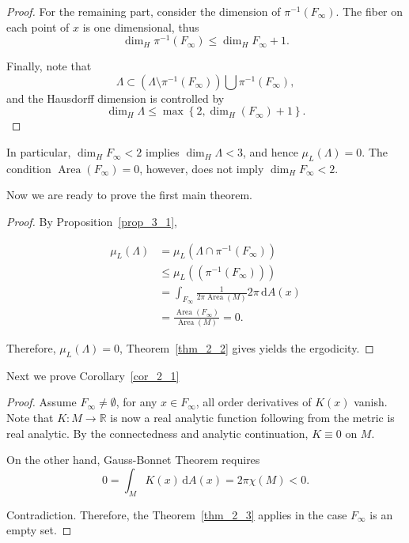 \documentclass[reqno,11pt]{article}
\theoremstyle{definition}
\theoremstyle{remark}
\numberwithin{equation}{section}
\DeclareMathOperator{\area}{Area}
\begin{document}
\begin{proof}
	For the remaining part, consider the dimension of $\pi^{-1}(F_{\infty})$. The fiber on each point of $x$ is one dimensional, thus
	\begin{displaymath}
		\dim_{H}\pi^{-1}(F_{\infty})\le \dim_{H}F_{\infty}+1.
	\end{displaymath}

	Finally, note that
	\begin{displaymath}
		\Lambda\subset \left(\Lambda\setminus\pi^{-1}(F_{\infty})\right)\bigcup \pi^{-1}(F_{\infty}),
	\end{displaymath}
	and the Hausdorff dimension is controlled by
	\begin{displaymath}
		\dim_{H}\Lambda\leq\max\left\{2,\dim_{H}(F_{\infty})+1\right\}.
	\end{displaymath}
\end{proof}

In particular, $\dim_{H}F_{\infty}<2$ implies $\dim_{H}\Lambda<3$, and hence $\mu_L(\Lambda)=0$. The condition $\area(F_\infty)=0$, however, does not imply $\dim_{H}F_{\infty}<2$.

Now we are ready to prove the first main theorem.

\surface*

\begin{proof}
	By Proposition~\ref{prop_3_1},

	\begin{displaymath}
		\begin{aligned}
			\mu_L(\Lambda) & =\mu_L(\Lambda\cap\pi^{-1}(F_\infty))                            \\
			               & \le \mu_L((\pi^{-1}(F_{\infty})))                                \\
			               & =\int_{F_{\infty}} \frac{1}{2\pi \area(M)} 2\pi \,\mathrm{d}A(x) \\
			               & =\frac{\area(F_\infty)}{\area(M)}=0.
		\end{aligned}
	\end{displaymath}

	Therefore, $\mu_{L}(\Lambda)=0$, Theorem~\ref{thm_2_2} gives yields the ergodicity.
\end{proof}

Next we prove Corollary~\ref{cor_2_1}

\analysurface*
\begin{proof}
	Assume $F_{\infty}\neq\emptyset$, for any $x\in F_{\infty}$, all order derivatives of $K(x)$ vanish. Note that $K:M\to\mathbb{R}$ is now a real analytic function following from the metric is real analytic. By the connectedness and analytic continuation, $K\equiv0$ on $M$.

	On the other hand, Gauss-Bonnet Theorem requires
	\begin{equation}
		0=\int_{M} K(x)\,\mathrm{d}A(x)=2\pi\chi(M)<0.
	\end{equation}

	Contradiction. Therefore, the Theorem~\ref{thm_2_3} applies in the case $F_{\infty}$ is an empty set.
\end{proof}
\end{document}
